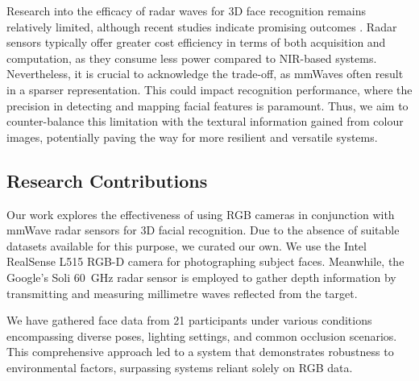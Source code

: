 \documentclass{mpaper}
\begin{document}
Research into the efficacy of radar waves for 3D face recognition remains relatively limited, although recent studies indicate promising outcomes \cite{hof2020face, lim2020dnn, kim2020face, pho2021radar, challa2021face}. Radar sensors typically offer greater cost efficiency in terms of both acquisition and computation, as they consume less power compared to NIR-based systems. Nevertheless, it is crucial to acknowledge the trade-off, as mmWaves often result in a sparser representation. This could impact recognition performance, where the precision in detecting and mapping facial features is paramount. Thus, we aim to counter-balance this limitation with the textural information gained from colour images, potentially paving the way for more resilient and versatile systems.


\subsection{Research Contributions}
Our work explores the effectiveness of using RGB cameras in conjunction with mmWave radar sensors for 3D facial recognition. Due to the absence of suitable datasets available for this purpose, we curated our own. We use the Intel RealSense L515 RGB-D camera \cite{intel-l515} for photographing subject faces. Meanwhile, the Google's Soli \qty{60}{\GHz} radar sensor \cite{lien2016soli} is employed to gather depth information by transmitting and measuring millimetre waves reflected from the target.

We have gathered face data from \num{21} participants under various conditions encompassing diverse poses, lighting settings, and common occlusion scenarios. This comprehensive approach led to a system that demonstrates robustness to environmental factors, surpassing systems reliant solely on RGB data.
\end{document}
